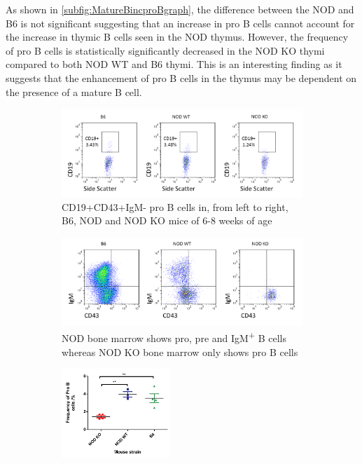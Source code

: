 As shown in \cref{subfig:MatureBincproBgraph}, the difference between the NOD and B6 is not significant suggesting that an increase in pro B cells cannot account for the increase in thymic B cells seen in the NOD thymus.
However, the frequency of pro B cells is statistically significantly decreased in the NOD KO thymi compared to both NOD WT and B6 thymi.
This is an interesting finding as it suggests that the enhancement of pro B cells in the thymus may be dependent on the presence of a mature B cell.


\begin{figure}
	\begin{subfigure}{\textwidth}
	\includegraphics[width=\textwidth]{Figures/MatureBincproB.png}
	\caption{CD19+CD43+IgM- pro B cells in, from left to right, B6, NOD and NOD KO mice of 6-8 weeks of age}
	\end{subfigure}
	\begin{subfigure}{\textwidth}
	\centering
	\includegraphics[width=\textwidth]{Figures/B6NODKOBM.png}
	\caption{NOD bone marrow shows pro, pre and IgM\textsuperscript{+} B cells whereas NOD KO bone marrow only shows pro B cells}
	\label{subfig:KOBM}
	\end{subfigure}
	\begin{subfigure}{\textwidth}
	\centering
	\includegraphics[width=0.45\textwidth]{Figures/MatureBincproBgraph.pdf}

\end{subfigure}
\end{figure}
